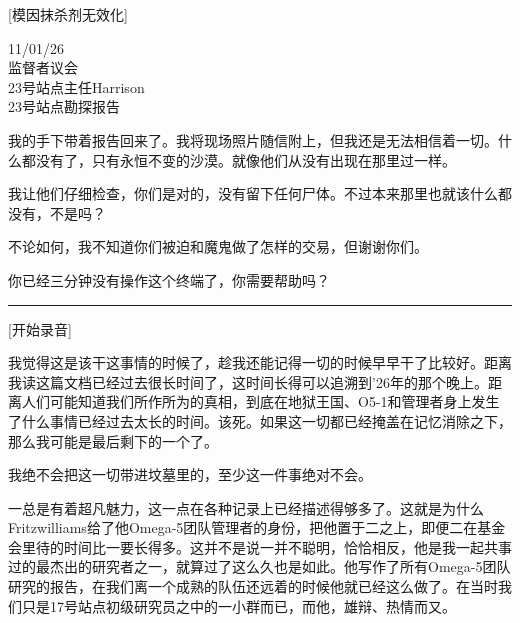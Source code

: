 \begin{scpboxc}
{[模因抹杀剂无效化]}
\end{scpboxc}

\begin{scpbox}

11/01/26\\
监督者议会\\
23号站点主任Harrison\\
23号站点勘探报告

我的手下带着报告回来了。我将现场照片随信附上，但我还是无法相信着一切。什么都没有了，只有永恒不变的沙漠。就像他们从没有出现在那里过一样。

我让他们仔细检查，你们是对的，没有留下任何尸体。不过本来那里也就该什么都没有，不是吗？

不论如何，我不知道你们被迫和魔鬼做了怎样的交易，但谢谢你们。


\end{scpbox}

\hr


\begin{scpboxc}
你已经三分钟没有操作这个终端了，你需要帮助吗？
\end{scpboxc}


\hrule




[开始录音]

我觉得这是该干这事情的时候了，趁我还能记得一切的时候早早干了比较好。距离我读这篇文档已经过去很长时间了，这时间长得可以追溯到'26年的那个晚上。距离人们可能知道我们所作所为的真相，到底在地狱王国、O5-1和管理者身上发生了什么事情已经过去太长的时间。该死。如果这一切都已经掩盖在记忆消除之下，那么我可能是最后剩下的一个了。

我绝不会把这一切带进坟墓里的，至少这一件事绝对不会。

一总是有着超凡魅力，这一点在各种记录上已经描述得够多了。这就是为什么Fritzwilliams给了他Omega-5团队管理者的身份，把他置于二之上，即便二在基金会里待的时间比一要长得多。这并不是说一并不聪明，恰恰相反，他是我一起共事过的最杰出的研究者之一，就算过了这么久也是如此。他写作了所有Omega-5团队研究的报告，在我们离一个成熟的队伍还远着的时候他就已经这么做了。在当时我们只是17号站点初级研究员之中的一小群而已，而他，雄辩、热情而又。

